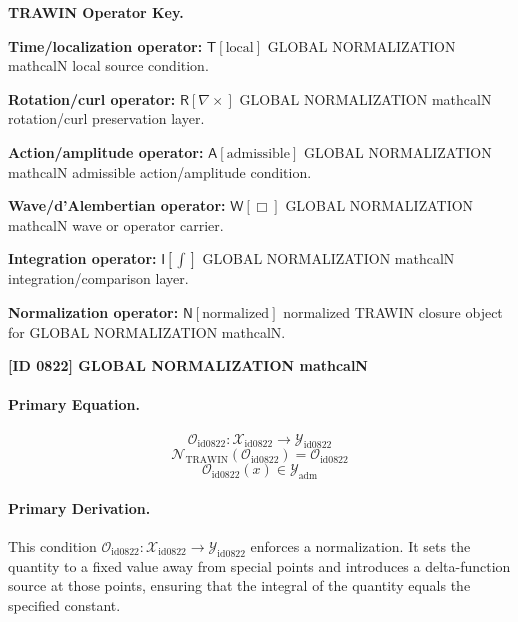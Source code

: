 \par\vspace{0.45\baselineskip}
\noindent\begin{minipage}[t]{\linewidth}
\begingroup
\small
\raggedright
\textbf{TRAWIN Operator Key.}\par
\noindent\textbf{Time/localization operator:} $\mathsf{T}\!\left[\mathrm{local}\right]$ GLOBAL NORMALIZATION mathcalN local source condition.\par
\noindent\textbf{Rotation/curl operator:} $\mathsf{R}\!\left[\nabla\times\right]$ GLOBAL NORMALIZATION mathcalN rotation/curl preservation layer.\par
\noindent\textbf{Action/amplitude operator:} $\mathsf{A}\!\left[\mathrm{admissible}\right]$ GLOBAL NORMALIZATION mathcalN admissible action/amplitude condition.\par
\noindent\textbf{Wave/d'Alembertian operator:} $\mathsf{W}\!\left[\Box\right]$ GLOBAL NORMALIZATION mathcalN wave or operator carrier.\par
\noindent\textbf{Integration operator:} $\mathsf{I}\!\left[\int\right]$ GLOBAL NORMALIZATION mathcalN integration/comparison layer.\par
\noindent\textbf{Normalization operator:} $\mathsf{N}\!\left[\mathrm{normalized}\right]$ normalized TRAWIN closure object for GLOBAL NORMALIZATION mathcalN.\par
\endgroup
\end{minipage}

\clearpage
\noindent\textbf{[ID 0822] GLOBAL NORMALIZATION mathcalN}\par
\vspace{0.35em}
\paragraph{Primary Equation.}
\[
\mathcal{O}_{\mathrm{id0822}}:\mathcal{X}_{\mathrm{id0822}}\longrightarrow\mathcal{Y}_{\mathrm{id0822}}
\]
\[
\mathcal{N}_{\mathrm{TRAWIN}}(\mathcal{O}_{\mathrm{id0822}})=\mathcal{O}_{\mathrm{id0822}}
\]
\[
\mathcal{O}_{\mathrm{id0822}}(x)\in\mathcal{Y}_{\mathrm{adm}}
\]

\paragraph{Primary Derivation.}
This condition \( \mathcal{O}_{\mathrm{id0822}}:\mathcal{X}_{\mathrm{id0822}}\longrightarrow\mathcal{Y}_{\mathrm{id0822}} \) enforces a normalization. It sets the quantity to a fixed value away from special points and introduces a delta-function source at those points, ensuring that the integral of the quantity equals the specified constant.
